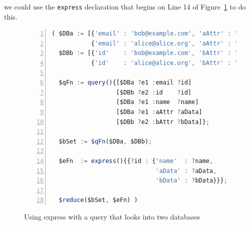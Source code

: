 \documentclass[9pt,letterpaper]{article}
\newcommand{\stt}[1]{\texttt{#1}} %
\begin{document}
\hspace{-2em} we could use the \stt{express} declaration that begins on Line 14 of Figure~\ref{code:two-database-query-express} to do this.

\begin{figure}[H]
    \caption{Using express with a query that looks into two databases}
    \label{code:two-database-query-express}
\begin{lstlisting}[language=JavaScript,numberstyle=\scriptsize,basicstyle=\ttfamily\scriptsize,numbers=left,stepnumber=1,breaklines=true]
( $DBa := [{'email' : 'bob@example.com', 'aAttr' : 'Bob-A-data',   'name' : 'Bob'},
           {'email' : 'alice@alice.org', 'aAttr' : 'Alice-A-data', 'name' : 'Alice'}];
  $DBb := [{'id'    : 'bob@example.com', 'bAttr' : 'Bob-B-data'},
           {'id'    : 'alice@alice.org', 'bAttr' : 'Alice-B-data'}];

  $qFn := query(){[$DBa ?e1 :email ?id]
                  [$DBb ?e2 :id    ?id]
                  [$DBa ?e1 :name  ?name]
                  [$DBa ?e1 :aAttr ?aData]
                  [$DBb ?e2 :bAttr ?bData]};

  $bSet := $qFn($DBa, $DBb);

  $eFn  := express(){{?id : {'name'  : ?name,
                             'aData' : ?aData,
                             'bData' : ?bData}}};

  $reduce($bSet, $eFn) )
\end{lstlisting}
\end{figure} \vspace{-2em}
\end{document}
